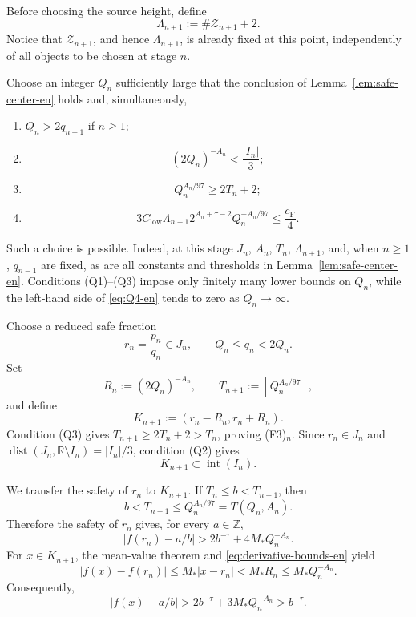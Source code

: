 \documentclass[11pt]{amsart}
\numberwithin{equation}{section}
\theoremstyle{definition}
\theoremstyle{remark}
\newcommand{\R}{\mathbb R}
\newcommand{\Z}{\mathbb Z}
\newcommand{\dist}{\operatorname{dist}}
\newcommand{\Int}{\operatorname{int}}
\newcommand{\abs}[1]{\left\lvert #1\right\rvert}
\begin{document}
Before choosing the source height, define
\begin{equation}\label{eq:Lambda-next-en}
\Lambda_{n+1}:=\#\mathcal Z_{n+1}+2.
\end{equation}
Notice that $\mathcal Z_{n+1}$, and hence $\Lambda_{n+1}$, is already
fixed at this point, independently of all objects to be chosen at
stage $n$.

Choose an integer $Q_n$ sufficiently large that the conclusion of
Lemma~\ref{lem:safe-center-en} holds and, simultaneously,
\begin{enumerate}[label=\textup{(Q\arabic*)},leftmargin=3em]
\item $Q_n>2q_{n-1}$ if $n\geq1$;
\item
\[
(2Q_n)^{-A_n}<\frac{|I_n|}{3};
\]
\item
\[
Q_n^{A_n/97}\geq2T_n+2;
\]
\item
\begin{equation}\label{eq:Q4-en}
3C_{\mathrm{low}}\Lambda_{n+1}
2^{A_n+\tau-2}Q_n^{-A_n/97}
\leq
\frac{c_{\mathrm F}}4.
\end{equation}
\end{enumerate}
Such a choice is possible. Indeed, at this stage $J_n$, $A_n$,
$T_n$, $\Lambda_{n+1}$, and, when $n\geq1$, $q_{n-1}$ are fixed, as
are all constants and thresholds in
Lemma~\ref{lem:safe-center-en}. Conditions
\textup{(Q1)}--\textup{(Q3)} impose only finitely many lower bounds on
$Q_n$, while the left-hand side of \eqref{eq:Q4-en} tends to zero as
$Q_n\to\infty$.

Choose a reduced safe fraction
\begin{equation}\label{eq:r-n-choice-en}
r_n=\frac{p_n}{q_n}\in J_n,
\qquad Q_n\leq q_n<2Q_n.
\end{equation}
Set
\begin{equation}\label{eq:R-T-next-en}
R_n:=(2Q_n)^{-A_n},
\qquad
T_{n+1}:=\left\lfloor Q_n^{A_n/97}\right\rfloor,
\end{equation}
and define
\begin{equation}\label{eq:K-next-en}
K_{n+1}:=(r_n-R_n,r_n+R_n).
\end{equation}
Condition \textup{(Q3)} gives $T_{n+1}\geq2T_n+2>T_n$, proving
\textup{(F3)}$_n$. Since $r_n\in J_n$ and
$\dist(J_n,\R\setminus I_n)=|I_n|/3$, condition \textup{(Q2)} gives
\[
K_{n+1}\subset\Int(I_n).
\]

We transfer the safety of $r_n$ to $K_{n+1}$. If
$T_n\leq b<T_{n+1}$, then
\[
b<T_{n+1}\leq Q_n^{A_n/97}=T(Q_n,A_n).
\]
Therefore the safety of $r_n$ gives, for every $a\in\Z$,
\begin{equation}\label{eq:safe-at-center-en}
\abs{f(r_n)-a/b}
>
2b^{-\tau}+4M_*Q_n^{-A_n}.
\end{equation}
For $x\in K_{n+1}$, the mean-value theorem and
\eqref{eq:derivative-bounds-en} yield
\[
\abs{f(x)-f(r_n)}
\leq M_*\abs{x-r_n}
<M_*R_n
\leq M_*Q_n^{-A_n}.
\]
Consequently,
\begin{equation}\label{eq:avoidance-on-K-en}
\abs{f(x)-a/b}
>
2b^{-\tau}+3M_*Q_n^{-A_n}
>b^{-\tau}.
\end{equation}
\end{document}
